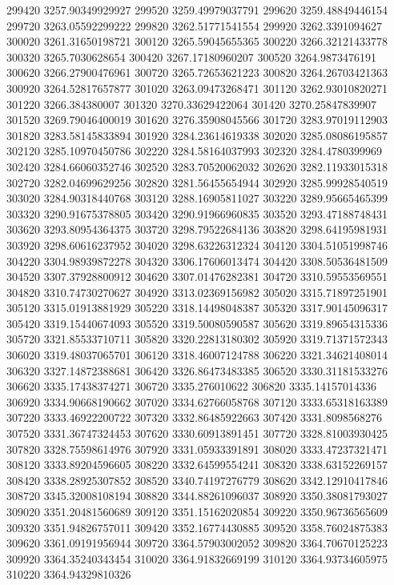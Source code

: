 {299420 3257.90349929927
299520 3259.49979037791
299620 3259.48849446154
299720 3263.05592299222
299820 3262.51771541554
299920 3262.3391094627
300020 3261.31650198721
300120 3265.59045655365
300220 3266.32121433778
300320 3265.7030628654
300420 3267.17180960207
300520 3264.9873476191
300620 3266.27900476961
300720 3265.72653621223
300820 3264.26703421363
300920 3264.52817657877
301020 3263.09473268471
301120 3262.93010820271
301220 3266.384380007
301320 3270.33629422064
301420 3270.25847839907
301520 3269.79046400019
301620 3276.35908045566
301720 3283.97019112903
301820 3283.58145833894
301920 3284.23614619338
302020 3285.08086195857
302120 3285.10970450786
302220 3284.58164037993
302320 3284.4780399969
302420 3284.66060352746
302520 3283.70520062032
302620 3282.11933015318
302720 3282.04699629256
302820 3281.56455654944
302920 3285.99928540519
303020 3284.90318440768
303120 3288.16905811027
303220 3289.95665465399
303320 3290.91675378805
303420 3290.91966960835
303520 3293.47188748431
303620 3293.80954364375
303720 3298.79522684136
303820 3298.64195981931
303920 3298.60616237952
304020 3298.63226312324
304120 3304.51051998746
304220 3304.98939872278
304320 3306.17606013474
304420 3308.50536481509
304520 3307.37928800912
304620 3307.01476282381
304720 3310.59553569551
304820 3310.74730270627
304920 3313.02369156982
305020 3315.71897251901
305120 3315.01913881929
305220 3318.14498048387
305320 3317.90145096317
305420 3319.15440674093
305520 3319.50080590587
305620 3319.89654315336
305720 3321.85533710711
305820 3320.22813180302
305920 3319.71371572343
306020 3319.48037065701
306120 3318.46007124788
306220 3321.34621408014
306320 3327.14872388681
306420 3326.86473483385
306520 3330.31181533276
306620 3335.17438374271
306720 3335.276010622
306820 3335.14157014336
306920 3334.90668190662
307020 3334.62766058768
307120 3333.65318163389
307220 3333.46922200722
307320 3332.86485922663
307420 3331.8098568276
307520 3331.36747324453
307620 3330.60913891451
307720 3328.81003930425
307820 3328.75598614976
307920 3331.05933391891
308020 3333.47237321471
308120 3333.89204596605
308220 3332.64599554241
308320 3338.63152269157
308420 3338.28925307852
308520 3340.74197276779
308620 3342.12910417846
308720 3345.32008108194
308820 3344.88261096037
308920 3350.38081793027
309020 3351.20481560689
309120 3351.15162020854
309220 3350.96736565609
309320 3351.94826757011
309420 3352.16774430885
309520 3358.76024875383
309620 3361.09191956944
309720 3364.57903002052
309820 3364.70670125223
309920 3364.35240343454
310020 3364.91832669199
310120 3364.93734605975
310220 3364.94329810326
}
